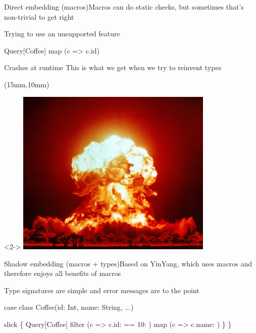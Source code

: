 \documentclass[compress,xcolor={usenames,dvipsnames,table}]{beamer}
\begin{document}
\begin{frame}[fragile]{Direct embedding (macros)}{Macros can do static checks, but sometimes that's non-trivial to get right}
  \vspace{1em}
  \begin{exampleblock}{Trying to use an unsupported feature}
    \begin{semiverbatim}
Query[Coffee] map (c => c.id\text{\color{blue}{.toDouble}})
    \end{semiverbatim}
  \end{exampleblock}

  \vspace{1em}
  \begin{alertblock}{Crashes at runtime}
    This is what we get when we try to reinvent types
  \end{alertblock}

  \begin{textblock*}{\textwidth}(15mm,10mm)
    \begin{visibleenv}<2->
      \includegraphics[height=8cm]{img/boom.jpg}
    \end{visibleenv}
  \end{textblock*}
\end{frame}

\begin{frame}[fragile]{Shadow embedding (macros + types)}{Based on YinYang, which uses macros and therefore enjoys all benefits of macros}
  \vspace{1em}
  \begin{exampleblock}{Type signatures are simple and error messages are to the point}
    \begin{semiverbatim}
case class Coffee(id: Int, name: String, ...)

slick \{
  Query[Coffee] filter
    (c => c.id: \text{\color{blue}{Int}} == 10: \text{\color{blue}{Int}}) map
    (c => c.name: \text{\color{blue}{String}})
  \}
\}
    \end{semiverbatim}
  \end{exampleblock}
\end{frame}
\end{document}
